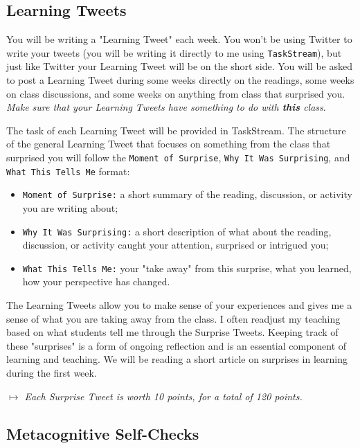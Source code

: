 \documentclass{tufte-handout}
\begin{document}
\subsection{Learning Tweets}
You will be writing a "Learning Tweet" each week. You won't be using Twitter to write your tweets (you will be writing it directly to me using \texttt{TaskStream}), but just like Twitter your Learning Tweet will be on the short side. You will be asked to post a Learning Tweet during some weeks directly on the readings, some weeks on class discussions, and some weeks on anything from class that surprised you. \emph{Make sure that your Learning Tweets have something to do with \textbf{this} class}.

The task of each Learning Tweet will be provided in TaskStream. The structure of the general Learning Tweet that focuses on something from the class that surprised you will follow the \texttt{Moment of Surprise}, \texttt{Why It Was Surprising}, and \texttt{What This Tells Me} format:

\begin{itemize}
	\itemsep-0.5em
	\item \texttt{Moment of Surprise:} a short summary of the reading, discussion, or activity you are writing about;
	\item \texttt{Why It Was Surprising:} a short description of what about the reading, discussion, or activity caught your attention, surprised or intrigued you;
	\item \texttt{What This Tells Me:} your "take away" from this surprise, what you learned, how your perspective has changed.
\end{itemize}

The Learning Tweets allow you to make sense of your experiences and gives me a sense of what you are taking away from the class. I often readjust my teaching based on what students tell me through the Surprise Tweets. Keeping track of these "surprises" is a form of ongoing reflection and is an essential component of learning and teaching. We will be reading a short article on surprises in learning during the first week.

\medskip\noindent\textit{$\mapsto$ Each Surprise Tweet is worth 10 points, for a total of 120 points.}

\subsection{Metacognitive Self-Checks}
\end{document}
